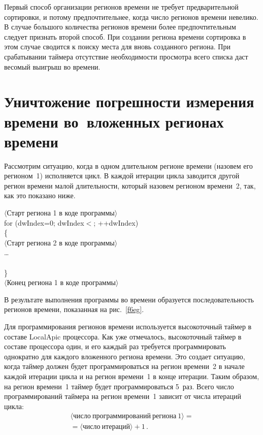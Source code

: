 \begin{multicols}{2}
   Первый способ организации регионов времени не требует предварительной сортировки, и
потому предпочтительнее, когда число регионов времени невелико. В случае большого количества
регионов времени более предпочтительным следует признать второй способ. При создании
региона времени сортировка в этом случае сводится к поиску места для вновь созданного региона.
При срабатывании таймера отсутствие необходимости просмотра всего списка даст весомый
выигрыш во времени.

\section{Уничтожение погрешности измерения времени во~вложенных
регионах времени} %

   Рассмотрим ситуацию, когда в одном длительном регионе времени (назовем его регионом~1)
исполняется цикл. В каждой итерации цикла заводится другой регион времени малой
длительности, который назовем регионом времени~2, так, как это показано ниже.

\medskip
\noindent
{\small
{\sf $\langle$Старт региона 1 в коде программы$\rangle$}\\
{\sf for (dwIndex=0; dwIndex\;$<$; ++dwIndex)}\\
\{  \\
 \hspace*{5mm}\textsf{$\langle$Старт региона 2 в коде программы$\rangle$}\\
    \hspace*{5mm}\ldots\\
    \hspace*{5mm}{\sf $\langle$Конец региона 2 в коде программы$\rangle$}\\
\}\\
{\sf $\langle$Конец региона 1 в коде программы$\rangle$}\\
 }

   В результате выполнения программы во времени образуется последовательность регионов
времени, показанная на рис.~\ref{f6eg}.



   Для программирования регионов времени используется высокоточный таймер в составе
LocalApic процессора. Как уже отмечалось, высокоточный таймер в составе процессора один, и
его каждый раз требуется программировать однократно для каждого вложенного региона времени.
Это создает ситуацию, когда таймер должен будет программироваться на регион времени~2 в
начале каж\-дой итерации цикла и на регион времени~1 в конце итерации. Таким образом, на
регион времени~1 таймер будет программироваться 5~раз. Всего число программирований
таймера на регион времени~1 зависит от числа итераций цикла:
   \begin{multline*}
   \langle\mathrm{число\ программирований\ региона\ 1}\rangle ={}\\
   {}= \langle\mathrm{число\
итераций}\rangle + 1\,.
   \end{multline*}


\end{multicols}
